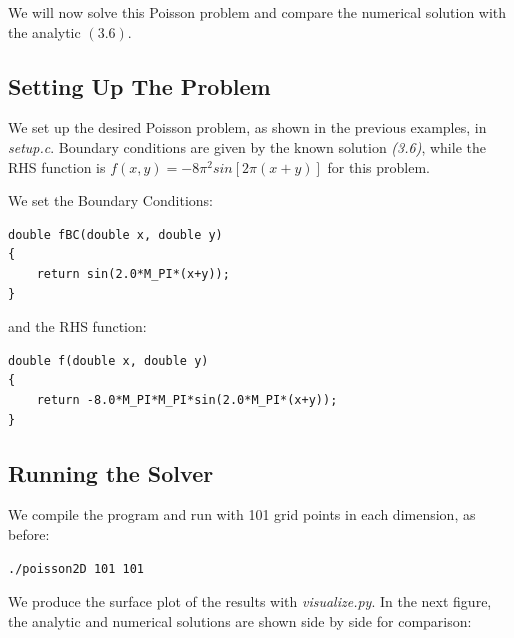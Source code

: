 \documentclass[11pt]{report}
\begin{document}
We will now solve this Poisson problem and compare the numerical solution with the analytic $(3.6)$.

\subsection{Setting Up The Problem}
We set up the desired Poisson problem, as shown in the previous examples, in \emph{setup.c}. Boundary conditions are given by the known solution \emph{(3.6)}, while the RHS function is $f(x,y) =  -8\pi^2 sin\left[ 2\pi \left( x + y\right) \right]$ for this problem. 
\newline

We set the Boundary Conditions:

\begin{lstlisting}
double fBC(double x, double y) 
{
    return sin(2.0*M_PI*(x+y));
}
\end{lstlisting}

and the RHS function:

\begin{lstlisting}
double f(double x, double y) 
{
    return -8.0*M_PI*M_PI*sin(2.0*M_PI*(x+y));
}
\end{lstlisting}

\subsection{Running the Solver}
We compile the program and run with 101 grid points in each dimension, as before:
\newline 

\begin{lstlisting}
./poisson2D 101 101
\end{lstlisting}

We produce the surface plot of the results with \emph{visualize.py}. In the next figure, the analytic and numerical solutions are shown side by side for comparison:
\end{document}
